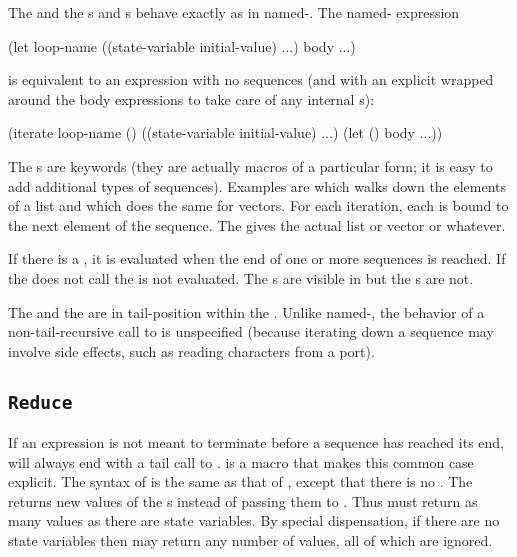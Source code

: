 The  and the s and s behave
exactly as in named-.  The named- expression
\begin{example}
  (let loop-name ((state-variable initial-value) ...)
    body ...)
\end{example}
is equivalent to an  expression with no sequences
 (and with an explicit
  wrapped around the body expressions to take care of any
 internal s):
\begin{example}
  (iterate loop-name
           ()
           ((state-variable initial-value) ...)
    (let () body ...))
\end{example}

The s are keywords (they are actually macros of a particular
 form; it is easy to add additional types of sequences).
Examples are  which walks down the elements of a list and
  which does the same for vectors.
For each iteration, each  is bound to the next
 element of the sequence.
The  gives the actual list or vector or whatever.

If there is a , it is evaluated when the end of one or more
 sequences is reached.
If the  does not call  the
  is not evaluated.
The s are visible in
  but the s are not.  

The  and the  are in tail-position within
 the .
Unlike named-, the behavior of a non-tail-recursive call to
  is unspecified (because iterating down a sequence may involve side
 effects, such as reading characters from a port).

\subsection{{\tt Reduce}}

If an  expression is not meant to terminate before a sequence
 has reached its end,
  will always end with a tail call to .
 is a macro that makes this common case explicit.
The syntax of  is
 the same as that of , except that there is no .
The  returns new values of the s
 instead of passing them to .
Thus  must return as many values as there are state
 variables.
By special dispensation, if there are
 no state variables then  may return any number of values,
 all of which are ignored.

